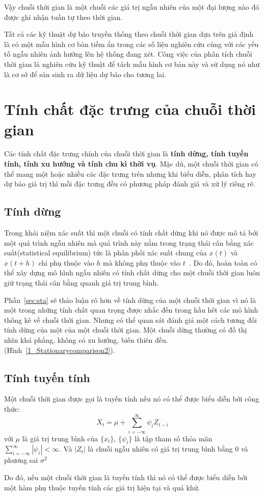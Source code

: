 Vậy chuỗi thời gian là một chuỗi các giá trị ngẫu nhiên của một đại lượng nào đó được ghi nhận tuần tự theo thời gian.

Tất cả các kỹ thuật dự báo truyền thống theo chuỗi thời gian dựa trên giả định là có một mẫu hình cơ bản tiềm ẩn trong các số liệu nghiên cứu cùng với các yếu tố ngẫu nhiên ảnh hưởng lên hệ thống đang xét. Công việc của phân tích chuỗi thời gian là nghiên cứu kỹ thuật để tách mẫu hình cơ bản này và sử dụng nó như là cơ sở để sản sinh ra dữ liệu dự báo cho tương lai.

\section{Tính chất đặc trưng của chuỗi thời gian}
Các tính chất đặc trưng chính \citep{cits} của chuỗi thời gian là \textbf{tính dừng, tính tuyến tính, tính xu hướng và tính chu kì thời vụ}. Mặc dù, một chuỗi thời gian có thể mang một hoặc nhiều các đặc trưng trên nhưng khi biểu diễn, phân tích hay dự báo giá trị thì mỗi đặc trưng đều có phương pháp đánh giá và xử lý riêng rẽ. 

\subsection{Tính dừng}
Trong khái niệm xác suất thì một chuỗi có tính chất dừng khi nó được mô tả bởi một quá trình ngẫu nhiên mà quá trình này nằm trong trạng thái cân bằng xác suất(statistical equilibrium) tức là phân phối xác suất chung của $x(t)$ và $x(t+h)$ chỉ phụ thuộc vào $h$ mà không phụ thuộc vào $t$~\citep{cits}. Do đó, hoàn toàn có thể xây dựng mô hình ngẫu nhiên có tính chất dừng cho một chuỗi thời gian luôn giữ trạng thái cân bằng quanh giá trị trung bình.

Phần~\ref{sec:sta} sẽ thảo luận rõ hơn về tính dừng của một chuỗi thời gian vì nó là một trong những tính chất quan trọng được nhắc đến trong hầu hết các mô hình thống kê về chuỗi thời gian. Nhưng có thể quan sát đánh giá một cách tương đối tính dừng của một của một chuỗi thời gian. Một chuỗi dừng thường có đồ thị nhìn khá phẳng, không có xu hướng, biến thiên đều. (Hình~\ref{1_Stationarycomparison2}).

\subsection{Tính tuyến tính}
\begin{defi}
	Một chuỗi thời gian được gọi là tuyến tính\citep{afts3} nếu nó có thể được biểu diễn bởi công thức:
	\begin{equation}
		X_t = \mu+\sum\limits_{i = -\infty}^{\infty}\psi_iZ_{t-i}
	\end{equation}
	với $\mu$ là giá trị trung bình của $\{x_t\}$, $\{ \psi_i\}$ là tập tham số thỏa mãn $\sum\limits_{i = -\infty}^{\infty}|\psi_i| < \infty$. Và $|Z_t|$ là chuỗi ngẫu nhiên có giá trị trung bình bằng $0$ và phương sai $\sigma^2$
\end{defi}
Do đó, nếu một chuỗi thời gian là tuyến tính thì nó có thể được biểu diễn bởi một hàm phụ thuộc tuyến tính các giá trị hiện tại và quá khứ.

